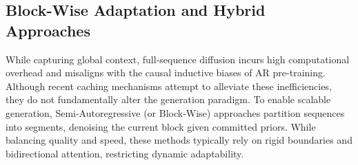 \documentclass[11pt]{article}
\begin{document}
\subsection{Block-Wise Adaptation and Hybrid Approaches} 

While capturing global context, full-sequence diffusion incurs high computational overhead and misaligns with the causal inductive biases of AR pre-training. Although recent caching mechanisms \citep{dLLMCache, dkv_cache, wu2025fast} attempt to alleviate these inefficiencies, they do not fundamentally alter the generation paradigm. 
To enable scalable generation, Semi-Autoregressive (or Block-Wise) approaches \citep{ssd_llm, BlockDiffusion} partition sequences into segments, denoising the current block given committed priors. While balancing quality and speed, these methods typically rely on rigid boundaries and bidirectional attention, restricting dynamic adaptability.




\end{document}
